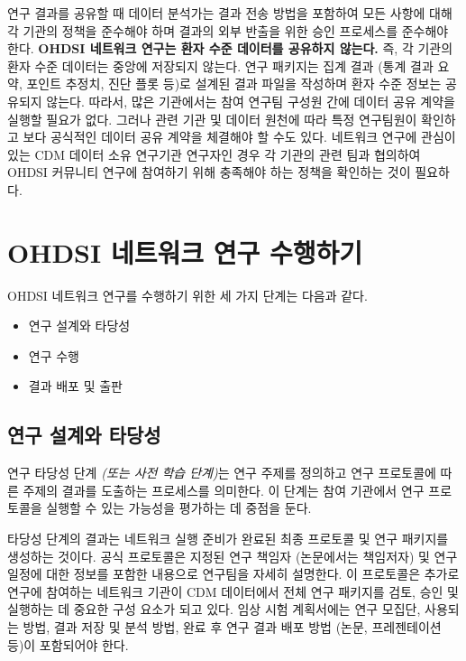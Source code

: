 \documentclass[10.5pt]{book}
\providecommand{\tightlist}{%
  \setlength{\itemsep}{0pt}\setlength{\parskip}{0pt}}
\theoremstyle{definition}
\theoremstyle{definition}
\theoremstyle{definition}
\theoremstyle{remark}
\begin{document}
연구 결과를 공유할 때 데이터 분석가는 결과 전송 방법을 포함하여 모든
사항에 대해 각 기관의 정책을 준수해야 하며 결과의 외부 반출을 위한 승인
프로세스를 준수해야 한다. \textbf{OHDSI 네트워크 연구는 환자 수준
데이터를 공유하지 않는다.} 즉, 각 기관의 환자 수준 데이터는 중앙에
저장되지 않는다. 연구 패키지는 집계 결과 (통계 결과 요약, 포인트 추정치,
진단 플롯 등)로 설계된 결과 파일을 작성하며 환자 수준 정보는 공유되지
않는다. 따라서, 많은 기관에서는 참여 연구팀 구성원 간에 데이터 공유
계약을 실행할 필요가 없다. 그러나 관련 기관 및 데이터 원천에 따라 특정
연구팀원이 확인하고 보다 공식적인 데이터 공유 계약을 체결해야 할 수도
있다. 네트워크 연구에 관심이 있는 CDM 데이터 소유 연구기관 연구자인 경우
각 기관의 관련 팀과 협의하여 OHDSI 커뮤니티 연구에 참여하기 위해
충족해야 하는 정책을 확인하는 것이 필요하다.

\section{OHDSI 네트워크 연구 수행하기}\label{ohdsi---}


OHDSI 네트워크 연구를 수행하기 위한 세 가지 단계는 다음과 같다.

\begin{itemize}
\tightlist
\item
  연구 설계와 타당성
\item
  연구 수행
\item
  결과 배포 및 출판
\end{itemize}

\subsection{연구 설계와 타당성}\label{--}

연구 타당성 단계 \emph{(또는 사전 학습 단계)}는 연구 주제를 정의하고
연구 프로토콜에 따른 주제의 결과를 도출하는 프로세스를 의미한다. 이
단계는 참여 기관에서 연구 프로토콜을 실행할 수 있는 가능성을 평가하는 데
중점을 둔다.

타당성 단계의 결과는 네트워크 실행 준비가 완료된 최종 프로토콜 및 연구
패키지를 생성하는 것이다. 공식 프로토콜은 지정된 연구 책임자 (논문에서는
책임저자) 및 연구 일정에 대한 정보를 포함한 내용으로 연구팀을 자세히
설명한다. 이 프로토콜은 추가로 연구에 참여하는 네트워크 기관이 CDM
데이터에서 전체 연구 패키지를 검토, 승인 및 실행하는 데 중요한 구성
요소가 되고 있다. 임상 시험 계획서에는 연구 모집단, 사용되는 방법, 결과
저장 및 분석 방법, 완료 후 연구 결과 배포 방법 (논문, 프레젠테이션 등)이
포함되어야 한다.
\end{document}
